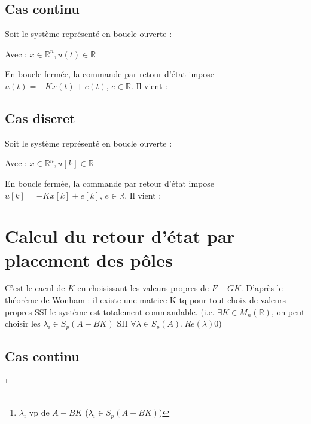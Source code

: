 \subsection{Cas continu}
\large{Soit le système représenté en boucle ouverte :}
\begin{center}
     \newline 
    
    Avec : $x \in \mathbb{R}^{n}, u(t) \in \mathbb{R}$
\end{center}
\large{En boucle fermée, la commande par retour d'état impose \newline
$ u(t) = -Kx(t) + e(t)$, $e \in \mathbb{R}$. Il vient :}
\begin{center}
\end{center}
\subsection{Cas discret}
\large{Soit le système représenté en boucle ouverte :}
\begin{center}
     \newline 
    
    Avec : $x \in \mathbb{R}^{n}, u[k] \in \mathbb{R}$
\end{center}
\large{En boucle fermée, la commande par retour d'état impose \newline
$ u[k] = -Kx[k] + e[k]$, $e \in \mathbb{R}$. Il vient :}
\begin{center}
\end{center}
\newpage
\section{Calcul du retour d'état par placement des pôles}
\large{C'est le cacul de $K$ en choisissant les valeurs propres de $F - GK$. D'après le \textcolor{BrickRed}{théorème de Wonham : il existe une matrice K tq pour tout choix de valeurs propres SSI le système est totalement commandable.} \newline
(i.e. $\exists K \in M_{n}(\mathbb{R})$, on peut choisir les $\lambda_{i} \in S_{p}(A - BK)$ SII $\forall \lambda \in S_{p}(A), Re(\lambda) 0$)}
\subsection{Cas continu}
\begin{center}
     \footnote{$\lambda_{i}$ vp de $A - BK$ ($\lambda_{i} \in S_{p}(A-BK)$)}
\end{center}
